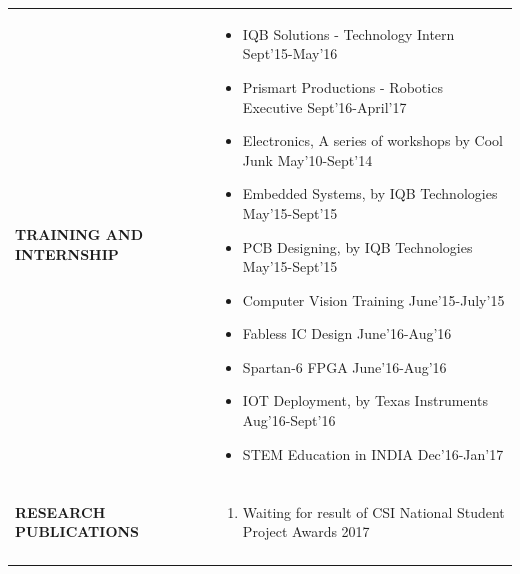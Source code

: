 \documentclass[a4paper]{article}
\begin{document}
\begin{longtable}{@{}m{3.0cm}m{14cm}@{}}
			
			\textrm{\textbf{TRAINING \newline AND \newline  INTERNSHIP}} & 
				\begin{itemize}
					\itemsep -2pt
					\item
					IQB Solutions - Technology Intern \hfill  Sept'15-May'16
					\item
					Prismart Productions - Robotics Executive \hfill  Sept'16-April'17
					\item
					Electronics, A series of workshops by Cool Junk \hfill  May'10-Sept'14
					\item
					Embedded Systems, by IQB Technologies \hfill  May'15-Sept'15
					\item
					PCB Designing, by IQB Technologies \hfill  May'15-Sept'15
					\item
					Computer Vision Training \hfill  June'15-July'15
					\item
					Fabless IC Design \hfill  June'16-Aug'16
					\item
					Spartan-6 FPGA \hfill  June'16-Aug'16
					\item
					IOT Deployment, by Texas Instruments \hfill  Aug'16-Sept'16
					\item
					STEM Education in INDIA \hfill  Dec'16-Jan'17
				\end{itemize}
			\\ \\
			
			
			\textrm{\textbf {RESEARCH \newline PUBLICATIONS}} & 
				\begin{enumerate}
					\itemsep -2pt
					\item
					Waiting for result of CSI National Student Project Awards 2017
				\end{enumerate}
			\\ \\
			

\end{longtable}
\end{document}
